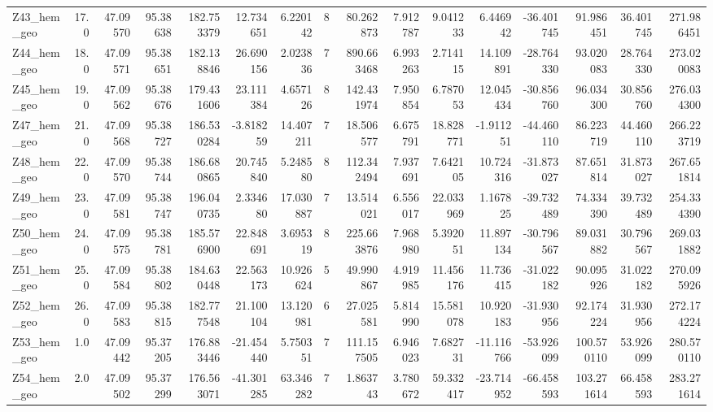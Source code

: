 \documentclass[11pt]{article}
\begin{document}
\begin{sidewaystable}
{\begin{tabular}{lrrrrrrrrrrrrrrr}
Z43\_hem\_geo &       17.0 &  47.09570 &  95.38638 &  182.753379 &  12.734651 &   6.220142 &  8 &   80.262873 &  7.912787 &   9.041233 &       6.446942 & -36.401745 &   91.986451 &    36.401745 &   271.986451 \\
Z44\_hem\_geo &       18.0 &  47.09571 &  95.38651 &  182.138846 &  26.690156 &   2.023836 &  7 &  890.663468 &  6.993263 &   2.714115 &      14.109891 & -28.764330 &   93.020083 &    28.764330 &   273.020083 \\
Z45\_hem\_geo &       19.0 &  47.09562 &  95.38676 &  179.431606 &  23.111384 &   4.657126 &  8 &  142.431974 &  7.950854 &   6.787053 &      12.045434 & -30.856760 &   96.034300 &    30.856760 &   276.034300 \\
Z47\_hem\_geo &       21.0 &  47.09568 &  95.38727 &  186.530284 &  -3.818259 &  14.407211 &  7 &   18.506577 &  6.675791 &  18.828771 &      -1.911251 & -44.460110 &   86.223719 &    44.460110 &   266.223719 \\
Z48\_hem\_geo &       22.0 &  47.09570 &  95.38744 &  186.680865 &  20.745840 &   5.248580 &  8 &  112.342494 &  7.937691 &   7.642105 &      10.724316 & -31.873027 &   87.651814 &    31.873027 &   267.651814 \\
Z49\_hem\_geo &       23.0 &  47.09581 &  95.38747 &  196.040735 &   2.334680 &  17.030887 &  7 &   13.514021 &  6.556017 &  22.033969 &       1.167825 & -39.732489 &   74.334390 &    39.732489 &   254.334390 \\
Z50\_hem\_geo &       24.0 &  47.09575 &  95.38781 &  185.576900 &  22.848691 &   3.695319 &  8 &  225.663876 &  7.968980 &   5.392051 &      11.897134 & -30.796567 &   89.031882 &    30.796567 &   269.031882 \\
Z51\_hem\_geo &       25.0 &  47.09584 &  95.38802 &  184.630448 &  22.563173 &  10.926624 &  5 &   49.990867 &  4.919985 &  11.456176 &      11.736415 & -31.022182 &   90.095926 &    31.022182 &   270.095926 \\
Z52\_hem\_geo &       26.0 &  47.09583 &  95.38815 &  182.777548 &  21.100104 &  13.120981 &  6 &   27.025581 &  5.814990 &  15.581078 &      10.920183 & -31.930956 &   92.174224 &    31.930956 &   272.174224 \\
Z53\_hem\_geo &        1.0 &  47.09442 &  95.37205 &  176.883446 & -21.454440 &   5.750351 &  7 &  111.157505 &  6.946023 &   7.682731 &     -11.116766 & -53.926099 &  100.570110 &    53.926099 &   280.570110 \\
Z54\_hem\_geo &        2.0 &  47.09502 &  95.37299 &  176.563071 & -41.301285 &  63.346282 &  7 &    1.863743 &  3.780672 &  59.332417 &     -23.714952 & -66.458593 &  103.271614 &    66.458593 &   283.271614 \\

\end{tabular}}
\end{sidewaystable}
\end{document}
